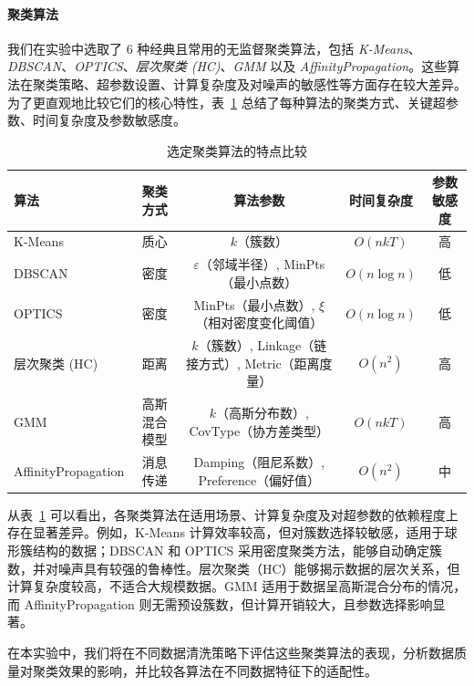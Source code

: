 \documentclass[10pt]{article} %
\numberwithin{equation}{section}
\begin{document}
\paragraph{聚类算法}
我们在实验中选取了 6 种经典且常用的无监督聚类算法，包括 \textit{K-Means}、\textit{DBSCAN}、\textit{OPTICS}、\textit{层次聚类 (HC)}、\textit{GMM} 以及 \textit{AffinityPropagation}。这些算法在聚类策略、超参数设置、计算复杂度及对噪声的敏感性等方面存在较大差异。为了更直观地比较它们的核心特性，表~\ref{tab:clustering_algorithms} 总结了每种算法的聚类方式、关键超参数、时间复杂度及参数敏感度。

\begin{table}[htbp]
    \centering
    \caption{选定聚类算法的特点比较}
    \label{tab:clustering_algorithms}
    \begin{tabular}{lcccc}
        \toprule
        \textbf{算法} & \textbf{聚类方式} & \textbf{算法参数} & \textbf{时间复杂度} & \textbf{参数敏感度} \\
        \midrule
        K-Means & 质心 & $k$（簇数） & $O(nkT)$ & 高 \\
        DBSCAN & 密度 & $\varepsilon$（邻域半径）, MinPts（最小点数） & $O(n \log n)$ & 低 \\
        OPTICS & 密度 & MinPts（最小点数）, $\xi$（相对密度变化阈值） & $O(n \log n)$ & 低 \\
        层次聚类 (HC) & 距离 & $k$（簇数）, Linkage（链接方式）, Metric（距离度量） & $O(n^2)$ & 高 \\
        GMM & 高斯混合模型 & $k$（高斯分布数）, CovType（协方差类型） & $O(nkT)$ & 高 \\
        AffinityPropagation & 消息传递 & Damping（阻尼系数）, Preference（偏好值） & $O(n^2)$ & 中 \\
        \bottomrule
    \end{tabular}
\end{table}

\noindent
从表~\ref{tab:clustering_algorithms} 可以看出，各聚类算法在适用场景、计算复杂度及对超参数的依赖程度上存在显著差异。例如，K-Means 计算效率较高，但对簇数选择较敏感，适用于球形簇结构的数据；DBSCAN 和 OPTICS 采用密度聚类方法，能够自动确定簇数，并对噪声具有较强的鲁棒性。层次聚类（HC）能够揭示数据的层次关系，但计算复杂度较高，不适合大规模数据。GMM 适用于数据呈高斯混合分布的情况，而 AffinityPropagation 则无需预设簇数，但计算开销较大，且参数选择影响显著。

在本实验中，我们将在不同数据清洗策略下评估这些聚类算法的表现，分析数据质量对聚类效果的影响，并比较各算法在不同数据特征下的适配性。
\end{document}
